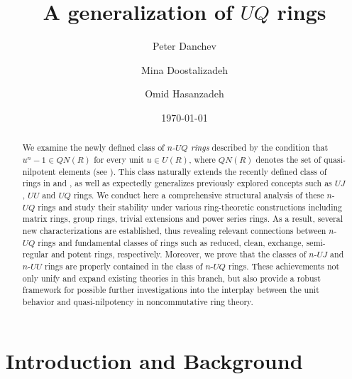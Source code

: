 \documentclass[12pt]{amsart}
\date{\today}
\theoremstyle{definition}
\begin{document}
\author[P. Danchev]{Peter Danchev}
\address{Institute of Mathematics and Informatics, Bulgarian Academy of Sciences, 1113 Sofia, Bulgaria}

\author[M. Doostalizadeh]{Mina Doostalizadeh}
\address{Department of Mathematics, Tarbiat Modares University, 14115-111 Tehran Jalal AleAhmad Nasr, Iran}

\author[O. Hasanzadeh]{Omid Hasanzadeh}
\address{Department of Mathematics, Tarbiat Modares University, 14115-111 Tehran Jalal AleAhmad Nasr, Iran}

\title[$n$-$UQ$ rings]{A generalization of $UQ$ rings}

\maketitle

\begin{abstract}
We examine the newly defined class of {\it $n$-$UQ$ rings} described by the condition that $u^n - 1 \in QN(R)$ for every unit $u \in U(R)$, where $QN(R)$ denotes the set of quasi-nilpotent elements (see \cite{Tien}). This class naturally extends the recently defined class of rings in \cite{daoa} and \cite{dam}, as well as expectedly generalizes previously explored concepts such as $UJ$, $UU$ and $UQ$ rings. We conduct here a comprehensive structural analysis of these $n$-$UQ$ rings and study their stability under various ring-theoretic constructions including matrix rings, group rings, trivial extensions and power series rings. As a result, several new characterizations are established, thus revealing relevant connections between $n$-$UQ$ rings and fundamental classes of rings such as reduced, clean, exchange, semi-regular and potent rings, respectively. Moreover, we prove that the classes of $n$-$UJ$ and $n$-$UU$ rings are properly contained in the class of $n$-$UQ$ rings. These achievements not only unify and expand existing theories in this branch, but also provide a robust framework for possible further investigations into the interplay between the unit behavior and quasi-nilpotency in noncommutative ring theory.
\end{abstract}

\section{Introduction and Background}
\end{document}
